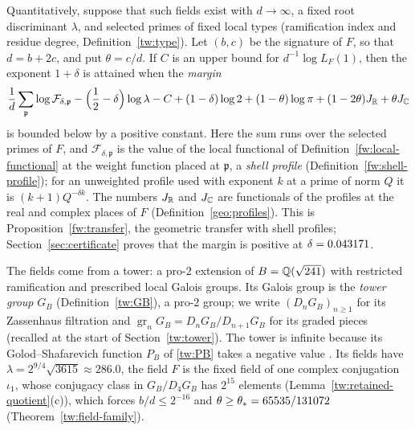 Quantitatively, suppose that such fields exist with $d\to\infty$, a
fixed root discriminant $\lambda$, and selected primes of fixed local
types (ramification index and residue degree, Definition~\ref{tw:type}). Let $(b,c)$ be the signature of $F$, so that $d=b+2c$, and put
$\theta=c/d$. If $C$ is an upper bound for $d^{-1}\log L_F(1)$, then
the exponent $1+\delta$ is attained when the \emph{margin}
\begin{equation}\label{intro:margin}
 \frac1d\sum_{\mathfrak p}\log\mathcal F_{\delta,\mathfrak p}
 -\Bigl(\frac12-\delta\Bigr)\log\lambda-C+(1-\delta)\log2
 +(1-\theta)\log\pi+(1-2\theta)J_\mathbb R+\theta J_\mathbb C
\end{equation}
is bounded below by a positive constant. Here the sum runs over the
selected primes of $F$, and $\mathcal F_{\delta,\mathfrak p}$ is the value
of the local functional of Definition~\ref{fw:local-functional} at the
weight function placed at $\mathfrak p$, a \emph{shell profile}
(Definition~\ref{fw:shell-profile}); for an unweighted profile used with exponent $k$
at a prime of norm $Q$ it is $(k+1)Q^{-\delta k}$. The numbers $J_\mathbb R$ and
$J_\mathbb C$ are functionals of the profiles at the real and complex places of
$F$ (Definition~\ref{geo:profiles}). This is
Proposition~\ref{fw:transfer}, the geometric transfer with shell
profiles; Section~\ref{sec:certificate} proves that the margin is
positive at $\delta=0.043171$.

The fields come from a tower: a pro-$2$ extension of
$B=\mathbb Q(\sqrt{241})$ with restricted ramification and prescribed local
Galois groups. Its Galois group is the \emph{tower group} $G_B$
(Definition~\ref{tw:GB}), a pro-$2$ group; we write $(D_nG_B)_{n\ge1}$ for its
Zassenhaus filtration and $\operatorname{gr}_nG_B=D_nG_B/D_{n+1}G_B$ for its
graded pieces (recalled at the start of Section~\ref{tw:tower}). The tower is
infinite because its Golod--Shafarevich function
$P_B$ of \eqref{tw:PB} takes a negative value
\cite{GolodShafarevich,HajirMaireRamakrishna2021Cutting}. Its fields
have $\lambda=2^{9/4}\sqrt{3615}\approx286.0$, the field $F$ is the fixed
field of one complex conjugation $\iota_1$, whose conjugacy class in
$G_B/D_4G_B$ has $2^{15}$ elements (Lemma~\ref{tw:retained-quotient}(c)),
which forces $b/d\le2^{-16}$ and $\theta\ge\theta_*=65535/131072$
(Theorem~\ref{tw:field-family}).

